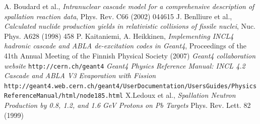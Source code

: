 \documentclass[20pt]{article}
\newenvironment{textbox}
{\begin{lrbox}{\dummybox}\begin{minipage}{0.9\columnwidth}}
{\end{minipage}\end{lrbox}\raisebox{-\depth}{\psshadowbox[framesep=1em,framearc=.1,shadow=true]{\usebox{\dummybox}}}\vspace{0.005\textheight}}
\begin{document}
\begin{center}
\begin{multicols}{3}
\begin{textbox}
{\Large
{}
\begin{thebibliography}{9}
 A. Boudard et al., \emph{Intranuclear cascade model for
    a comprehensive description of spallation reaction data}, Phys.
  Rev. C66 (2002) 044615
 J. Benlliure et al., \emph{Calculated nuclide
    production yields in relativistic collisions of fissile nuclei},
  Nuc. Phys. A628 (1998) 458
 P. Kaitaniemi, A. Heikkinen, \emph{Implementing INCL4
    hadronic cascade and ABLA de-excitation codes in Geant4},
  Proceedings of the 41th Annual Meeting of the Finnish Physical
  Society (2007)
 \emph{Geant4 collaboration website} {\tt http://\-cern.ch/\-geant4}
 \emph{Geant4 Physics Reference Manual: INCL 4.2 Cascade and ABLA V3 Evaporation with Fission} {\tt http://geant4.web.cern.ch/\-geant4/\-UserDocumentation/\-UsersGuides/\-PhysicsReferenceManual/\-html/\-node185.html}
 X.Ledoux et al., \emph{Spallation Neutron Production by
  0.8, 1.2, and 1.6 GeV Protons on Pb Targets} Phys. Rev. Lett. 82
  (1999)
%
%
\end{thebibliography}
}

\end{textbox}

\end{multicols}

\end{center}
\end{document}
